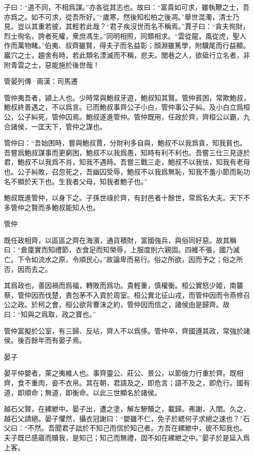 \documentclass[12pt,a4paper]{ctexbook}
\begin{document}
子曰：“道不同，不相爲謀。”亦各從其志也。故曰：“富貴如可求，雖執鞭之士，吾亦爲之。如不可求，從吾所好。”“歲寒，然後知松柏之後凋。”舉世混濁，清士乃見。豈以其重若彼，其輕若此哉？“君子疾沒世而名不稱焉。”賈子曰：“貪夫徇財，烈士徇名，誇者死權，衆庶馮生。”同明相照，同類相求。“雲從龍，風從虎，聖人作而萬物睹。”伯夷、叔齊雖賢，得夫子而名益彰；顏淵雖篤學，附驥尾而行益顯。巖穴之士，趨舍有時，若此類名湮滅而不稱，悲夫。閭巷之人，欲砥行立名者，非附青雲之士，惡能施於後世哉！\par
管晏列傳·兩漢：司馬遷 \par
管仲夷吾者，潁上人也。少時常與鮑叔牙遊，鮑叔知其賢。管仲貧困，常欺鮑叔，鮑叔終善遇之，不以爲言。已而鮑叔事齊公子小白，管仲事公子糾。及小白立爲桓公，公子糾死，管仲囚焉。鮑叔遂進管仲。管仲既用，任政於齊，齊桓公以霸，九合諸侯，一匡天下，管仲之謀也。\par
管仲曰：“吾始困時，嘗與鮑叔賈，分財利多自與，鮑叔不以我爲貪，知我貧也。吾嘗爲鮑叔謀事而更窮困，鮑叔不以我爲愚，知時有利不利也。吾嘗三仕三見逐於君，鮑叔不以我爲不肖，知我不遇時。吾嘗三戰三走，鮑叔不以我怯，知我有老母也。公子糾敗，召忽死之，吾幽囚受辱，鮑叔不以我爲無恥，知我不羞小節而恥功名不顯於天下也。生我者父母，知我者鮑子也。”\par
鮑叔既進管仲，以身下之。子孫世祿於齊，有封邑者十餘世，常爲名大夫。天下不多管仲之賢而多鮑叔能知人也。\par
管仲\par
既任政相齊，以區區之齊在海濱，通貨積財，富國強兵，與俗同好惡。故其稱曰：“倉廩實而知禮節，衣食足而知榮辱，上服度則六親固。四維不張，國乃滅亡。下令如流水之原，令順民心。”故論卑而易行。俗之所欲，因而予之；俗之所否，因而去之。\par
其爲政也，善因禍而爲福，轉敗而爲功。貴輕重，慎權衡。桓公實怒少姬，南襲蔡，管仲因而伐楚，責包茅不入貢於周室。桓公實北征山戎，而管仲因而令燕修召公之政。於柯之會，桓公欲背曹沫之約，管仲因而信之，諸侯由是歸齊。故曰：“知與之爲取，政之寶也。”\par
管仲富擬於公室，有三歸、反坫，齊人不以爲侈。管仲卒，齊國遵其政，常強於諸侯。後百餘年而有晏子焉。\par
晏子\par
晏平仲嬰者，萊之夷維人也。事齊靈公、莊公、景公，以節儉力行重於齊。既相齊，食不重肉，妾不衣帛。其在朝，君語及之，即危言；語不及之，即危行。國有道，即順命；無道，即衡命。以此三世顯名於諸侯。\par
越石父賢，在縲紲中。晏子出，遭之塗，解左驂贖之，載歸。弗謝，入閨。久之，越石父請絕。晏子懼然，攝衣冠謝曰：“嬰雖不仁，免子於緦何子求絕之速也？”石父曰：“不然。吾聞君子詘於不知己而信於知己者。方吾在縲紲中，彼不知我也。夫子既已感寤而贖我，是知己；知己而無禮，固不如在縲紲之中。”晏子於是延入爲上客。\par
\end{document}
